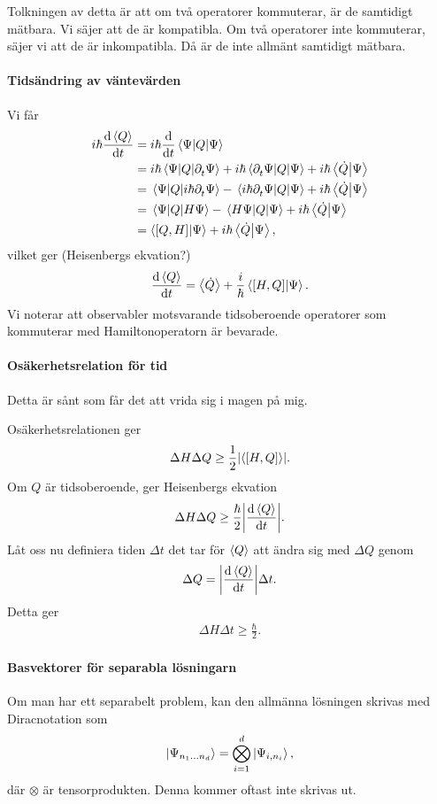 Tolkningen av detta är att om två operatorer kommuterar, är de samtidigt mätbara. Vi säjer att de är kompatibla. Om två operatorer inte kommuterar, säjer vi att de är inkompatibla. Då är de inte allmänt samtidigt mätbara.

\paragraph{Tidsändring av väntevärden}
Vi får
\begin{align*}
	i\hbar\dv{\expval{Q}}{t} &= i\hbar\dv{t}\expval{Q}{\Psi} \\
	                         &= i\hbar\mel{\Psi}{Q}{\partial_{t}^{}\Psi} + i\hbar\mel{\partial_{t}^{}\Psi}{Q}{\Psi} + i\hbar\braket{\dot{Q}}{\Psi} \\
	                         &= \mel{\Psi}{Q}{i\hbar\partial_{t}^{}\Psi} - \mel{i\hbar\partial_{t}^{}\Psi}{Q}{\Psi} + i\hbar\braket{\dot{Q}}{\Psi} \\
	                         &= \mel{\Psi}{Q}{H\Psi} - \mel{H\Psi}{Q}{\Psi} + i\hbar\braket{\dot{Q}}{\Psi} \\
	                         &= \braket{[Q, H]}{\Psi} + i\hbar\braket{\dot{Q}}{\Psi},
\end{align*}
vilket ger (Heisenbergs ekvation?)
\begin{align*}
	\dv{\expval{Q}}{t} = \expval{\dot{Q}} + \frac{i}{\hbar}\braket{[H, Q]}{\Psi}.
\end{align*}
Vi noterar att observabler motsvarande tidsoberoende operatorer som kommuterar med Hamiltonoperatorn är bevarade.

\paragraph{Osäkerhetsrelation för tid}
Detta är sånt som får det att vrida sig i magen på mig.

Osäkerhetsrelationen ger
\begin{align*}
	\Delta H\Delta Q\geq\frac{1}{2}\abs{\expval{[H, Q]}}.
\end{align*}
Om $Q$ är tidsoberoende, ger Heisenbergs ekvation
\begin{align*}
	\Delta H\Delta Q\geq\frac{\hbar}{2}\abs{\dv{\expval{Q}}{t}}.
\end{align*}
Låt oss nu definiera tiden $\Delta t$ det tar för $\expval{Q}$ att ändra sig med $\Delta Q$ genom
\begin{align*}
	\Delta Q = \abs{\dv{\expval{Q}}{t}}\Delta t.
\end{align*}
Detta ger
\begin{align*}
	\Delta H\Delta t\geq\frac{\hbar}{2}.
\end{align*}

\paragraph{Basvektorer för separabla lösningarn}
Om man har ett separabelt problem, kan den allmänna lösningen skrivas med Diracnotation som
\begin{align*}
	\ket{\Psi_{n_{1}\dots n_{d}}} = \bigotimes\limits_{i = 1}^{d}\ket{\Psi_{i, n_{i}}},
\end{align*}
där $\otimes$ är tensorprodukten. Denna kommer oftast inte skrivas ut.